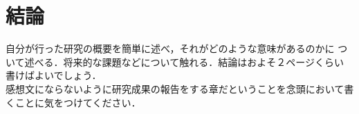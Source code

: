 \chapter{結論}
自分が行った研究の概要を簡単に述べ，それがどのような意味があるのかに
ついて述べる．将来的な課題などについて触れる．結論はおよそ２ページくらい
書けばよいでしょう．\\

感想文にならないように研究成果の報告をする章だということを念頭において書
くことに気をつけてください．
